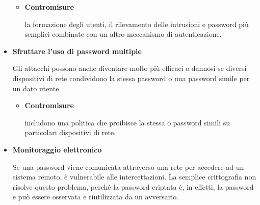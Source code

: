 \begin{itemize}
\begin{itemize}
    \item \textbf{Contromisure}
    
     la formazione degli utenti, il rilevamento delle intrusioni e password più semplici combinate con un altro meccanismo di autenticazione.
\end{itemize}

\item\textbf{Sfruttare l'uso di password multiple}

Gli attacchi possono anche diventare molto più efficaci o dannosi se diversi dispositivi di rete condividono la stessa password o una password simile per un dato utente. 

\begin{itemize}
    \item \textbf{Contromisure} 
    
    includono una politica che proibisce la stessa o password simili su particolari dispositivi di rete.
\end{itemize}
\newpage
\item \textbf{Monitoraggio elettronico}

Se una password viene comunicata attraverso una rete per accedere ad un sistema remoto, è vulnerabile alle intercettazioni. La semplice crittografia non risolve questo problema, perché la password criptata è, in effetti, la password e può essere osservata e riutilizzata da un avversario.
\end{itemize}
